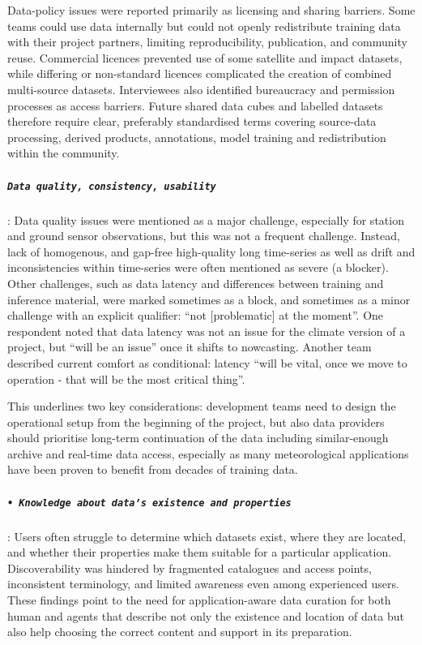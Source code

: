 \documentclass[acmtog,nonacm]{acmart}
\begin{document}
Data-policy issues were reported primarily as licensing and sharing barriers. Some teams could use data internally but could not openly redistribute training data with their project partners, limiting reproducibility, publication, and community reuse. Commercial licences prevented use of some satellite and impact datasets, while differing or non-standard licences complicated the creation of combined multi-source datasets. Interviewees also identified bureaucracy and permission processes as access barriers. Future shared data cubes and labelled datasets therefore require clear, preferably standardised terms covering source-data processing, derived products, annotations, model training and redistribution within the community.

\subparagraph{\texttt{Data quality, consistency, usability}} 
:\newline
Data quality issues were mentioned as a major challenge, especially for station and ground sensor observations, but this was not a frequent challenge. Instead, lack of homogenous, and gap-free high-quality long time-series as well as drift and inconsistencies within time-series were often mentioned as severe (a blocker). Other challenges, such as data latency and differences between training and inference material, were marked sometimes as a block, and sometimes as a minor challenge with an explicit qualifier: “not [problematic] at the moment”. One respondent noted that data latency was not an issue for the climate version of a project, but “will be an issue” once it shifts to nowcasting. Another team described current comfort as conditional: latency “will be vital, once we move to operation - that will be the most critical thing”. 

This underlines two key considerations: development teams need to design the operational setup from the beginning of the project, but also data providers should prioritise long-term continuation of the data including similar-enough archive and real-time data access, especially as many meteorological applications have been proven to benefit from decades of training data.

\subparagraph{\texttt{•	Knowledge about data’s existence and properties}} 
:\newline
Users often struggle to determine which datasets exist, where they are located, and whether their properties make them suitable for a particular application. Discoverability was hindered by fragmented catalogues and access points, inconsistent terminology, and limited awareness even among experienced users. These findings point to the need for application-aware data curation for both human and agents that describe not only the existence and location of data but also help choosing the correct content and support in its preparation.  
\end{document}

